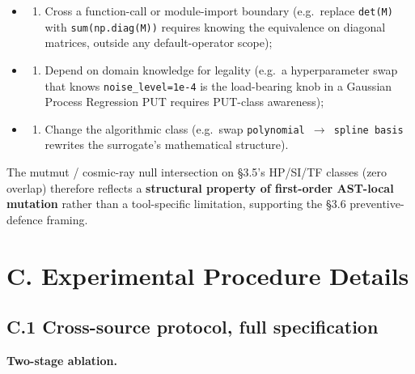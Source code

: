 \documentclass[acmsmall,screen,review]{acmart}
\providecommand{\tightlist}{\setlength{\itemsep}{0pt}\setlength{\parskip}{0pt}}
\begin{document}
\begin{itemize}
\tightlist
\item
  \begin{enumerate}
  \def\labelenumi{(\alph{enumi})}
  \tightlist
  \item
    Cross a function-call or module-import boundary (e.g.~replace
    \texttt{det(M)} with \texttt{sum(np.diag(M))} requires knowing the
    equivalence on diagonal matrices, outside any default-operator
    scope);
  \end{enumerate}
\item
  \begin{enumerate}
  \def\labelenumi{(\alph{enumi})}
  \setcounter{enumi}{1}
  \tightlist
  \item
    Depend on domain knowledge for legality (e.g.~a hyperparameter swap
    that knows \texttt{noise\_level=1e-4} is the load-bearing knob in a
    Gaussian Process Regression PUT requires PUT-class awareness);
  \end{enumerate}
\item
  \begin{enumerate}
  \def\labelenumi{(\alph{enumi})}
  \setcounter{enumi}{2}
  \tightlist
  \item
    Change the algorithmic class (e.g.~swap
    \texttt{polynomial\ $\to$\ spline\ basis} rewrites the surrogate's
    mathematical structure).
  \end{enumerate}
\end{itemize}

The mutmut / cosmic-ray null intersection on §3.5's HP/SI/TF classes
(zero overlap) therefore reflects a \textbf{structural property of
first-order AST-local mutation} rather than a tool-specific limitation,
supporting the §3.6 preventive-defence framing.


\section{C. Experimental Procedure Details}\label{c.-experimental-procedure-details}

\subsection{C.1 Cross-source protocol, full specification}\label{c.1-cross-source-v4-protocol-full-specification}

\textbf{Two-stage ablation.}
\end{document}
